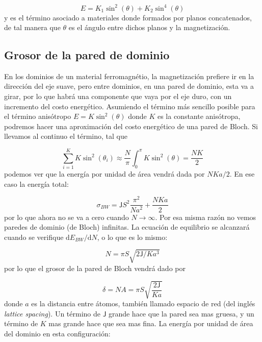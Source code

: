 \documentclass[12pt,a4paper]{book}
\numberwithin{equation}{section}
\numberwithin{figure}{section}
\newcommand{\D}{\mathrm{d}}
\newcommand{\Jsf}{\mathsf{J}}
\begin{document}
\begin{equation}
    E=K_1 \sin^2(\theta) + K_2 \sin^4 (\theta)
\end{equation}
y es el término asociado a materiales donde formados por planos concatenados, de tal manera que $\theta$ es el ángulo entre dichos planos y la magnetización.

\subsection{Grosor de la pared de dominio}

En los dominios de un material ferromagnétio, la magnetización prefiere ir en la dirección del eje suave, pero entre dominios, en una pared de dominio, esta va a girar, por lo que habrá una componente que vaya por el eje duro, con un incremento del costo energético. Asumiendo el término más sencillo posible para el término anisótropo $E=K \sin^2(\theta)$ donde $K$ es la constante anisótropa, podremos hacer una aproximación del costo energético de una pared de Bloch. Si llevamos al continuo el término, tal que

\begin{equation}
    \sum_{i=1}^K K \sin^2(\theta_i) \approx \frac{N}{\pi} \int_0^\pi K\sin^2(\theta) = \frac{NK}{2}
\end{equation}
podemos ver que la energía por unidad de área vendrá dada por $NKa/2$. En ese caso la energía total:

\begin{equation}
    \sigma_{BW} = \Jsf S^2\frac{\pi^2}{Na^2} + \frac{NKa}{2}
\end{equation}
por lo que ahora no se va a cero cuando $N\rightarrow\infty$. Por esa misma razón no vemos paredes de dominio (de Bloch) infinitas. La ecuación de equilibrio se alcanzará cuando se verifique  $\D E_{BW} / \D N$, o lo que es lo mismo:

\begin{equation}
N = \pi S \sqrt{2 \Jsf / K a^3}
\end{equation}
por lo que el grosor de la pared de Bloch vendrá dado por

\begin{equation}
    \delta = NA=\pi S\sqrt{\frac{2\Jsf}{Ka}}
\end{equation}
donde $a$ es la distancia entre átomos, también llamado espacio de red (del inglés \textit{lattice spacing}). Un término de $\Jsf$ grande hace que la pared sea mas gruesa, y un término de $K$ mas grande hace que sea mas fina. La energía por unidad de área del dominio en esta configuración:
\end{document}
